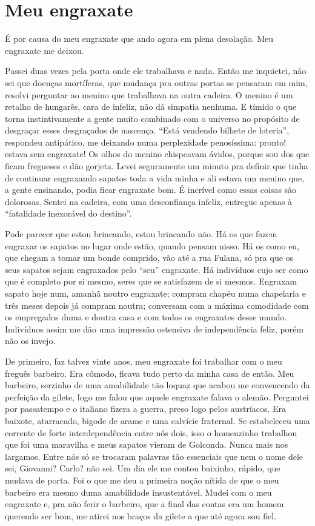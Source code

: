 \chapter{Meu engraxate}

É por causa do meu engraxate que ando agora em plena desolação. Meu
engraxate me deixou.

Passei duas vezes pela porta onde ele trabalhava e nada. Então me
inquietei, não sei que doenças mortíferas, que mudança pra outras portas
se pensaram em mim, resolvi perguntar ao menino que trabalhava na outra
cadeira. O menino é um retalho de hungarês, cara de infeliz, não dá
simpatia nenhuma. E tímido o que torna instintivamente a gente muito
combinado com o universo no propósito de desgraçar esses desgraçados de
nascença. ``Está vendendo bilhete de loteria'', respondeu antipático, me
deixando numa perplexidade penosíssima: pronto! estava sem engraxate! Os
olhos do menino chispeavam ávidos, porque sou dos que ficam fregueses e
dão gorjeta. Levei seguramente um minuto pra definir que tinha de
continuar engraxando sapatos toda a vida minha e ali estava um menino
que, a gente ensinando, podia ficar engraxate bom. É incrível como essas
coisas são dolorosas. Sentei na cadeira, com uma desconfiança infeliz,
entregue apenas à ``fatalidade inexorável do destino''.

Pode parecer que estou brincando, estou brincando não. Há os que fazem
engraxar os sapatos no lugar onde estão, quando pensam nisso. Há os como
eu, que chegam a tomar um bonde comprido, vão até a rua Fulana, só pra
que os seus sapatos sejam engraxados pelo ``seu'' engraxate. Há indivíduos
cujo ser como que é completo por si mesmo, seres que se satisfazem de si
mesmos. Engraxam sapato hoje num, amanhã noutro engraxate; compram
chapéu numa chapelaria e três meses depois já compram noutra; conversam
com a máxima comodidade com os empregados duma e doutra casa e com todos
os engraxates desse mundo. Indivíduos assim me dão uma impressão
ostensiva de independência feliz, porém não os invejo.

De primeiro, faz talvez vinte anos, meu engraxate foi trabalhar com o
meu freguês barbeiro. Era cômodo, ficava tudo perto da minha casa de
então. Meu barbeiro, serzinho de uma amabilidade tão loquaz que acabou
me convencendo da perfeição da gilete, logo me falou que aquele
engraxate falava o alemão. Perguntei por passatempo e o italiano fizera
a guerra, preso logo pelos austríacos. Era baixote, atarracado, bigode
de arame e uma calvície fraternal. Se estabeleceu uma corrente de forte
interdependência entre nós dois, isso o homenzinho trabalhou que foi uma
maravilha e meus sapatos vieram de Golconda. Nunca mais nos largamos.
Entre nós só se trocaram palavras tão essenciais que nem o nome dele
sei, Giovanni? Carlo? não sei. Um dia ele me contou baixinho, rápido,
que mudava de porta. Foi o que me deu a primeira noção nítida de que o
meu barbeiro era mesmo duma amabilidade insustentável. Mudei com o meu
engraxate e, pra não ferir o barbeiro, que a final das contas era um
homem querendo ser bom, me atirei nos braços da gilete a que até agora
sou fiel.

